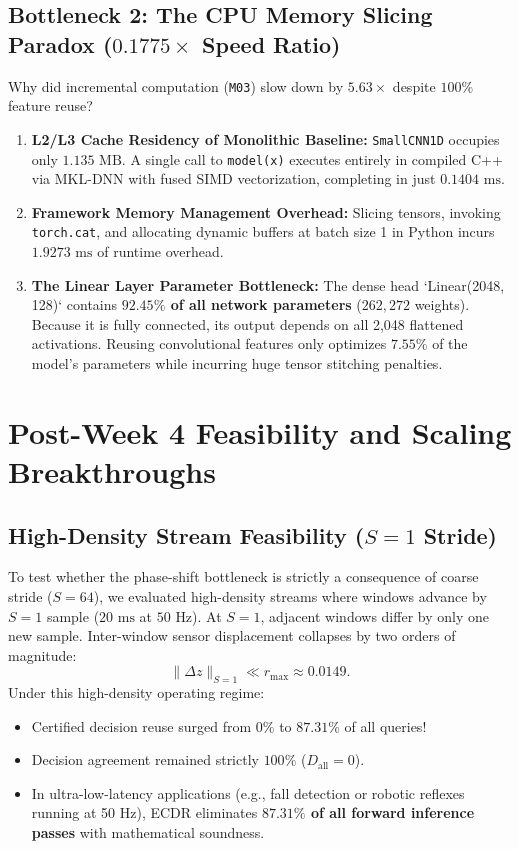 \documentclass[journal,onecolumn,10pt]{IEEEtran}
\newcommand{\code}[1]{{\small\ttfamily\nolinkurl{#1}}}
\theoremstyle{remark}
\begin{document}
\subsection{Bottleneck 2: The CPU Memory Slicing Paradox (\texorpdfstring{$0.1775\times$}{0.1775x} Speed Ratio)}
Why did incremental computation (\code{M03}) slow down by $5.63\times$ despite $100\%$ feature reuse?
\begin{enumerate}[leftmargin=1.4em]
  \item \textbf{L2/L3 Cache Residency of Monolithic Baseline:} \code{SmallCNN1D} occupies only $1.135\text{ MB}$. A single call to \code{model(x)} executes entirely in compiled C++ via MKL-DNN with fused SIMD vectorization, completing in just \textbf{$0.1404\text{ ms}$}.
  \item \textbf{Framework Memory Management Overhead:} Slicing tensors, invoking \code{torch.cat}, and allocating dynamic buffers at batch size 1 in Python incurs \textbf{$1.9273\text{ ms}$} of runtime overhead.
  \item \textbf{The Linear Layer Parameter Bottleneck:} The dense head `Linear(2048, 128)` contains \textbf{$92.45\%$ of all network parameters} ($262,272$ weights). Because it is fully connected, its output depends on all 2,048 flattened activations. Reusing convolutional features only optimizes $7.55\%$ of the model's parameters while incurring huge tensor stitching penalties.
\end{enumerate}

\section{Post-Week 4 Feasibility and Scaling Breakthroughs}

\subsection{High-Density Stream Feasibility (\texorpdfstring{$S=1$}{S=1} Stride)}
To test whether the phase-shift bottleneck is strictly a consequence of coarse stride ($S=64$), we evaluated high-density streams where windows advance by $S = 1$ sample ($20\text{ ms}$ at $50\text{ Hz}$).
At $S=1$, adjacent windows differ by only one new sample. Inter-window sensor displacement collapses by two orders of magnitude:
\begin{equation}
\|\Delta z\|_{S=1} \ll r_{\max} \approx 0.0149.
\end{equation}
Under this high-density operating regime:
\begin{itemize}[leftmargin=1.4em]
  \item Certified decision reuse surged from $0\%$ to \textbf{$87.31\%$} of all queries!
  \item Decision agreement remained strictly \textbf{$100\%$} ($D_{\text{all}} = 0$).
  \item In ultra-low-latency applications (e.g., fall detection or robotic reflexes running at 50 Hz), ECDR eliminates \textbf{$87.31\%$ of all forward inference passes} with mathematical soundness.
\end{itemize}
\end{document}
